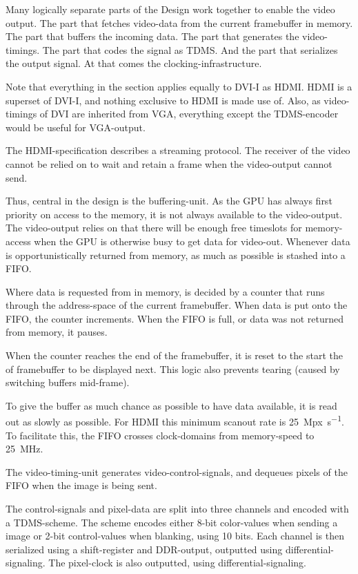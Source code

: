 \documentclass[../main/report.tex]{subfiles}
\begin{document}
Many logically separate parts of the Design work together to enable the video output.
The part that fetches video-data from the current framebuffer in memory.
The part that buffers the incoming data.
The part that generates the video-timings.
The part that codes the signal as TDMS.
And the part that serializes the output signal.
At that comes the clocking-infrastructure.

Note that everything in the section applies equally to DVI-I as HDMI. HDMI is a superset of DVI-I, and nothing exclusive to HDMI is made use of.
Also, as video-timings of DVI are inherited from VGA, everything except the TDMS-encoder would be useful for VGA-output.

The HDMI-specification describes a streaming protocol.
The receiver of the video cannot be relied on to wait and retain a frame when the video-output cannot send.

Thus, central in the design is the buffering-unit.
As the GPU has always first priority on access to the memory, it is not always available to the video-output.
The video-output relies on that there will be enough free timeslots for memory-access when the GPU is otherwise busy to get data for video-out.
Whenever data is opportunistically returned from memory, as much as possible is stashed into a FIFO.

Where data is requested from in memory, is decided by a counter that runs through the address-space of the current framebuffer.
When data is put onto the FIFO, the counter increments. %
When the FIFO is full, or data was not returned from memory, it pauses.

When the counter reaches the end of the framebuffer, it is reset to the start the of framebuffer to be displayed next.
This logic also prevents tearing (caused by switching buffers mid-frame).

To give the buffer as much chance as possible to have data available, it is read out as slowly as possible.
For HDMI this minimum scanout rate is \SI{25}{Mpx\per s}.
To facilitate this, the FIFO crosses clock-domains from memory-speed to \SI{25}{MHz}.


The video-timing-unit generates video-control-signals, and dequeues pixels of the FIFO when the image is being sent.

The control-signals and pixel-data are split into three channels and encoded with a TDMS-scheme.
The scheme encodes either 8-bit color-values when sending a image or 2-bit control-values when blanking, using 10 bits.
Each channel is then serialized using a shift-register and DDR-output, outputted using differential-signaling.
The pixel-clock is also outputted, using differential-signaling.

\end{document}
